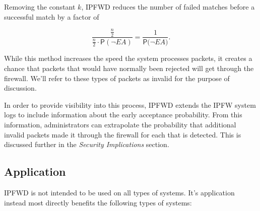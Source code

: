 \documentclass[journal]{IEEEtran}
\begin{document}
  Removing the constant $k$, IPFWD reduces the number of failed matches before
  a successful match by a factor of

  \[
  \frac
      {\frac{n}{2}}
      {\frac{n}{2} \cdot \mathsf{P}(\neg{\textit{EA}})} 
  = \frac{1}{\mathsf{P}(\neg{\textit{EA})}}.
  \]

  While this method increases the speed the system processes packets, it
  creates a chance that packets that would have normally been rejected will get
  through the firewall. We'll refer to these types of packets as invalid for
  the purpose of discussion.

  In order to provide visibility into this process, IPFWD extends the IPFW
  system logs to include information about the early acceptance probability.
  From this information, administrators can extrapolate the probability that
  additional invalid packets made it through the firewall for each that is
  detected. This is discussed further in the \textit{Security Implications}
  section.

  \subsection{Application}

    IPFWD is not intended to be used on all types of systems. It's application
    instead most directly benefits the following types of systems:
\end{document}
